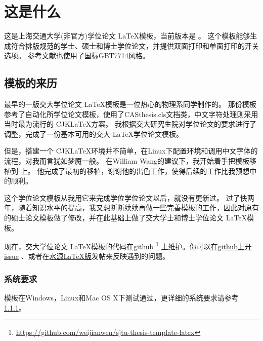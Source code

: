 
\chapter{这是什么}
\label{chap:what}

这是上海交通大学(非官方)学位论文 \LaTeX 模板，当前版本是 \version 。
这个模板能够生成符合排版规范的学士、硕士和博士学位论文，并提供双面打印和单面打印的开关选项。
参考文献也使用了国标GBT7714风格。

\section{模板的来历}

最早的一版交大学位论文 \LaTeX 模板是一位热心的物理系同学制作的。
那份模板参考了自动化所学位论文模板，使用了CASthesis.cls文档类，中文字符处理则采用当时最为流行的 CJK\LaTeX 方案。
我根据交大研究生院对学位论文的要求进行了调整，完成了一份基本可用的交大 \LaTeX 学位论文模板。

但是，搭建一个 CJK\LaTeX 环境并不简单，在Linux下配置环境和调用中文字体的流程，对我而言犹如梦魇一般。
在William Wang的建议下，我开始着手把模板移植到 \XeTeX 上。
他完成了最初的移植，谢谢他的出色工作，使得后续的工作比我预想中的顺利。

这个学位论文模板从我用它来完成学位学位论文以后，就没有更新过。
过了快两年，随着知识水平的提高，我又想断断续续再做一些完善模板的工作，因此对原有的硕士论文模板做了修改，并在此基础上做了交大学士和博士学位论文 \LaTeX 模板。

现在，交大学位论文 \LaTeX 模板的代码在github
\footnote{\url{https://github.com/weijianwen/sjtu-thesis-template-latex}}
上维护。你可以\href{https://github.com/weijianwen/sjtu-thesis-template-latex/issues}{在github上开issue}
、或者在\href{https://bbs.sjtu.edu.cn/bbsdoc?board=TeX_LaTeX}{水源LaTeX版}发帖来反映遇到的问题。

\subsection{系统要求}
\label{sec:requirements}

模板在Windows，Linux和Mac OS X下测试通过，更详细的系统要求请参考\ref{sec:requirements}。

